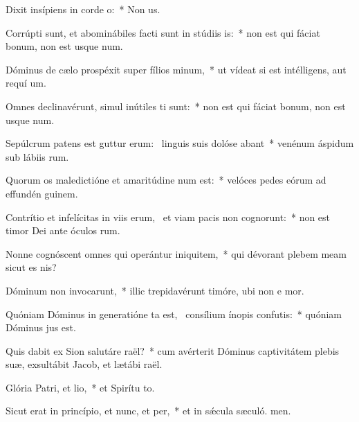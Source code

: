 \item Dixit insípiens in corde o:~* Non  us.
\item Corrúpti sunt, et abominábiles facti sunt in stúdiis is:~* non est qui fáciat bonum, non est usque  num.
\item Dóminus de cælo prospéxit super fílios minum,~* ut vídeat si est intélligens, aut requí um.
\item Omnes declinavérunt, simul inútiles ti sunt:~* non est qui fáciat bonum, non est usque  num.
\item Sepúlcrum patens est guttur erum:~\pscross{} linguis suis dolóse abant~* venénum áspidum sub lábiis rum.
\item Quorum os maledictióne et amaritúdine num est:~* velóces pedes eórum ad effundén guinem.
\item Contrítio et infelícitas in viis erum,~\pscross{} et viam pacis non cognorunt:~* non est timor Dei ante óculos rum.
\item Nonne cognóscent omnes qui operántur iniquitem,~* qui dévorant plebem meam sicut es nis?
\item Dóminum non invocarunt,~* illic trepidavérunt timóre, ubi non e mor.
\item Quóniam Dóminus in generatióne ta est,~\pscross{} consílium ínopis confutis:~* quóniam Dóminus  jus est.
\item Quis dabit ex Sion salutáre raël?~* cum avérterit Dóminus captivitátem plebis suæ, exsultábit Jacob, et lætábi raël.
\item Glória Patri, et lio,~* et Spirítu to.
\item Sicut erat in princípio, et nunc, et per,~* et in sǽcula sæculó. men.
